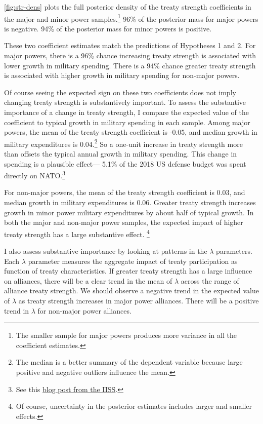 \documentclass[12pt]{article}
\begin{document}
\autoref{fig:str-dens} plots the full posterior density of the treaty strength coefficients in the major and minor power samples.\footnote{The smaller sample for major powers produces more variance in all the coefficient estimates.} 
96\% of the posterior mass for major powers is negative. 
94\% of the posterior mass for minor powers is positive. 


These two coefficient estimates match the predictions of Hypotheses 1 and 2. 
For major powers, there is a 96\% chance increasing treaty strength is associated with lower growth in military spending. 
There is a 94\% chance greater treaty strength is associated with higher growth in military spending for non-major powers.


Of course seeing the expected sign on these two coefficients does not imply changing treaty strength is substantively important. 
To assess the substantive importance of a change in treaty strength, I compare the expected value of the coefficient to typical growth in military spending in each sample. 
Among major powers, the mean of the treaty strength coefficient is -0.05, and median growth in military expenditures is 0.04.\footnote{The median is a better summary of the dependent variable because large positive and negative outliers influence the mean.} 
So a one-unit increase in treaty strength more than offsets the typical annual growth in military spending. 
This change in spending is a plausible effect--- 5.1\% of the 2018 US defense budget was spent directly on NATO.\footnote{See this \href{https://www.iiss.org/blogs/military-balance/2018/07/us-and-nato-allies-costs-and-value}{blog post from the IISS}.} 


For non-major powers, the mean of the treaty strength coefficient is 0.03, and median growth in military expenditures is 0.06. 
Greater treaty strength increases growth in minor power military expenditures by about half of typical growth. 
In both the major and non-major power samples, the expected impact of higher treaty strength has a large substantive effect. \footnote{Of course, uncertainty in the posterior estimates includes larger and smaller effects.}


I also assess substantive importance by looking at patterns in the $\lambda$ parameters. 
Each $\lambda$ parameter measures the aggregate impact of treaty participation as function of treaty characteristics. 
If greater treaty strength has a large influence on alliances, there will be a clear trend in the mean of $\lambda$ across the range of alliance treaty strength.
We should observe a negative trend in the expected value of $\lambda$ as treaty strength increases in major power alliances. 
There will be a positive trend in $\lambda$ for non-major power alliances. 
\end{document}
